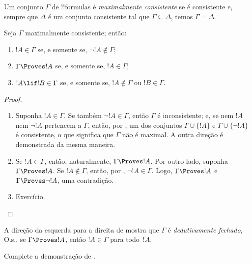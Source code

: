 \documentclass[../../../include/open-logic-section]{subfiles}
\begin{document}


\begin{defn}
Um conjunto $\Gamma$ de !!{formula}s é \emph{maximalmente consistente}
se é consistente e, sempre que $\Delta$ é um conjunto consistente tal
que $\Gamma \subseteq \Delta$, temos $\Gamma = \Delta$.
\end{defn}

\begin{lem}
Seja $\Gamma$ maximalmente consistente; então:
\begin{enumerate}
\item {} $!A \in \Gamma$ se, e somente se, $\lnot !A
  \notin \Gamma$;
\item {} $\Gamma \Proves !A$ se, e somente se, $!A \in \Gamma$; 
\item {} $!A \lif !B \in \Gamma$ se, e somente se,
  $!A \notin \Gamma$ ou $!B \in \Gamma$.
\end{enumerate}
\end{lem}

\begin{proof}
\begin{enumerate}
\item Suponha $!A \in \Gamma$. Se também $\lnot !A \in \Gamma$, então
  $\Gamma$ é inconsistente; e, se nem $!A$ nem $\lnot!A$ pertencem a
  $\Gamma$, então, por , um dos conjuntos
  $\Gamma\cup\{!A\}$ e $\Gamma \cup \{\lnot !A\}$ é consistente, o que
  significa que $\Gamma$ não é maximal. A outra direção é demonstrada
  da mesma maneira.
\item Se $!A \in \Gamma$, então, naturalmente, $\Gamma \Proves !A$.
  Por outro lado, suponha $\Gamma \Proves !A$. Se $!A \notin \Gamma$,
  então, por , $\lnot !A \in \Gamma$. Logo,
  $\Gamma \Proves !A$ e $\Gamma \Proves \lnot !A$, uma contradição.
\item Exercício.
\end{enumerate}
\end{proof}

A direção da esquerda para a direita de 
mostra que $\Gamma$ é \emph{dedutivamente fechado}, O.s.\@, se
$\Gamma \Proves !A$, então $!A \in \Gamma$ para todo~$!A$.

\begin{prob}
  Complete a demonstração de .
\end{prob}
\end{document}
